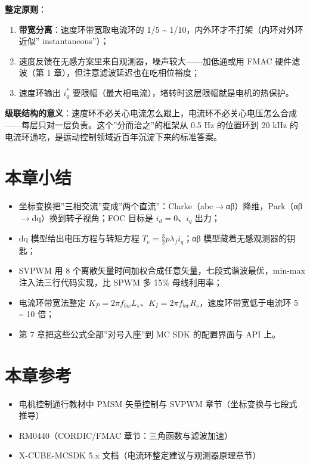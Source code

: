 \documentclass[
  UTF8,
  scheme=plain,
  fontsize=10pt,
  openany
]{ctexbook}
\begin{document}
\textbf{整定原则}：

\begin{enumerate}
\def\labelenumi{\arabic{enumi}.}
\tightlist
\item
  \textbf{带宽分离}：速度环带宽取电流环的 1/5 \textasciitilde{}
  1/10，内外环才不打架（内环对外环近似'' instantaneous''）；
\item
  速度反馈在无感方案里来自观测器，噪声较大------加低通或用 FMAC
  硬件滤波（第 1 章），但注意滤波延迟也在吃相位裕度；
\item
  速度环输出 \(i_q^{*}\)
  要限幅（最大相电流），堵转时这层限幅就是电机的热保护。
\end{enumerate}

\textbf{级联结构的意义}：速度环不必关心电流怎么跟上，电流环不必关心电压怎么合成------每层只对一层负责。这个''分而治之''的框架从
0.5 Hz 的位置环到 20 kHz
的电流环通吃，是运动控制领域近百年沉淀下来的标准答案。

\section{本章小结}\label{ux672cux7ae0ux5c0fux7ed3-5}

\begin{itemize}
\tightlist
\item
  坐标变换把''三相交流''变成''两个直流''：Clarke（abc\(\rightarrow\)αβ）降维，Park（αβ\(\rightarrow\)dq）换到转子视角；FOC
  目标是 \(i_d = 0\)、\(i_q\) 出力；
\item
  dq 模型给出电压方程与转矩方程
  \(T_e = \frac{3}{2} p \lambda_f i_q\)；αβ 模型藏着无感观测器的钥匙；
\item
  SVPWM 用 8 个离散矢量时间加权合成任意矢量，七段式谐波最优，min-max
  注入法三行代码实现，比 SPWM 多 15\% 母线利用率；
\item
  电流环带宽法整定
  \(K_P = 2\pi f_{bw} L_s\)、\(K_I = 2\pi f_{bw} R_s\)，速度环带宽低于电流环
  5 \textasciitilde{} 10 倍；
\item
  第 7 章把这些公式全部''对号入座''到 MC SDK 的配置界面与 API 上。
\end{itemize}

\section{本章参考}\label{ux672cux7ae0ux53c2ux8003-5}

\begin{itemize}
\tightlist
\item
  电机控制通行教材中 PMSM 矢量控制与 SVPWM 章节（坐标变换与七段式推导）
\item
  RM0440（CORDIC/FMAC 章节：三角函数与滤波加速）
\item
  X-CUBE-MCSDK 5.x 文档（电流环整定建议与观测器原理章节）
\end{itemize}
\end{document}
